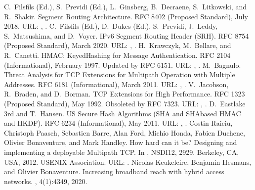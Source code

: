 \documentclass[letterpaper,10pt,english]{sphinxmanual}
\begin{document}
\begin{sphinxthebibliography}{10}
\sphinxAtStartPar
C. Filsfils (Ed.), S. Previdi (Ed.), L. Ginsberg, B. Decraene, S. Litkowski, and R. Shakir. Segment Routing Architecture. RFC 8402 (Proposed Standard), July 2018. URL: , .
\sphinxAtStartPar
C. Filsfils (Ed.), D. Dukes (Ed.), S. Previdi, J. Leddy, S. Matsushima, and D. Voyer. IPv6 Segment Routing Header (SRH). RFC 8754 (Proposed Standard), March 2020. URL: , .
\sphinxAtStartPar
H. Krawczyk, M. Bellare, and R. Canetti. HMAC: Keyed\sphinxhyphen{}Hashing for Message Authentication. RFC 2104 (Informational), February 1997. Updated by RFC 6151. URL: , .
\sphinxAtStartPar
M. Bagnulo. Threat Analysis for TCP Extensions for Multipath Operation with Multiple Addresses. RFC 6181 (Informational), March 2011. URL: , .
\sphinxAtStartPar
V. Jacobson, R. Braden, and D. Borman. TCP Extensions for High Performance. RFC 1323 (Proposed Standard), May 1992. Obsoleted by RFC 7323. URL: , .
\sphinxAtStartPar
D. Eastlake 3rd and T. Hansen. US Secure Hash Algorithms (SHA and SHA\sphinxhyphen{}based HMAC and HKDF). RFC 6234 (Informational), May 2011. URL: , .
\sphinxAtStartPar
Costin Raiciu, Christoph Paasch, Sebastien Barre, Alan Ford, Michio Honda, Fabien Duchene, Olivier Bonaventure, and Mark Handley. How hard can it be? Designing and implementing a deployable Multipath TCP. In , NSDI\textquotesingle{}12, 29\textendash{}29. Berkeley, CA, USA, 2012. USENIX Association. URL: .
\sphinxAtStartPar
Nicolas Keukeleire, Benjamin Hesmans, and Olivier Bonaventure. Increasing broadband reach with hybrid access networks. , 4(1):43\textendash{}49, 2020.

\end{sphinxthebibliography}
\end{document}
